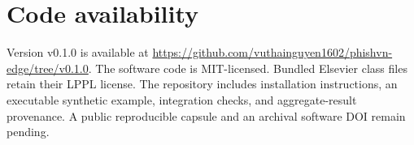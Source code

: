 \section*{Code availability}
Version v0.1.0 is available at \url{https://github.com/vuthainguyen1602/phishvn-edge/tree/v0.1.0}. The software code is MIT-licensed. Bundled Elsevier class files retain their LPPL license. The repository includes installation instructions, an executable synthetic example, integration checks, and aggregate-result provenance. A public reproducible capsule and an archival software DOI remain pending.
